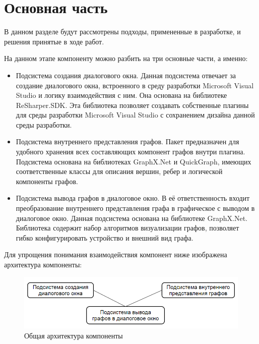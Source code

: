 \documentclass{matmex-diploma}
\begin{document}
\newpage
\section{Основная часть}

В данном разделе будут рассмотрены подходы, примененные в разработке, и решения принятые в ходе работ.

На данном этапе компоненту можно разбить на три основные части, а именно:


\begin{itemize}

         \item { Подсистема создания диалогового окна. Данная подсистема отвечает за создание диалогового окна, встроенного в среду разработки Microsoft Visual Studio и логику взаимодействия с ним. Она основана на библиотеке ReSharper.SDK. Эта библиотека позволяет создавать собственные плагины для среды разработки Microsoft Visual Studio с сохранением дизайна данной среды разработки. }
        \item { Подсистема внутреннего представления графов. Пакет предназначен для удобного хранения всех составляющих компонент графов внутри плагина. Подсистема основана на библиотеках GraphX.Net и QuickGraph, имеющих соответственные классы для описания вершин, ребер и логической компоненты графов. }
       \item { Подсистема вывода графов в диалоговое окно. В её ответственность входит преобразование внутреннего представления графа в графическое с выводом в диалоговое окно. Данная подсистема основана на библиотеке GraphX.Net. Библиотека содержит набор алгоритмов визуализации графов, позволяет гибко конфигурировать устройство и внешний вид графа.
}
\end{itemize}
 
Для упрощения понимания взаимодействия компонент ниже изображена архитектура компоненты:
\newpage
\begin{figure}[t]
\label{Pack}
\centering
\includegraphics[width=\textwidth]{Packages.png}
\caption{Общая архитектура компоненты}
\end{figure}
\end{document}
